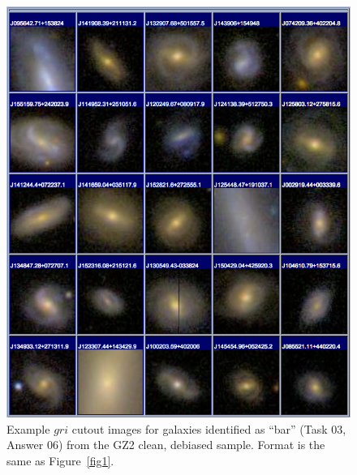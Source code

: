 \documentclass[useAMS,usenatbib]{mn2e}
\begin{document}
\newpage
\clearpage
\begin{figure}
\includegraphics[angle=0,width=7.0in]{figures/gallery/bar.png}
\caption{Example $gri$ cutout images for galaxies identified as ``bar'' (Task 03, Answer 06) from the GZ2 clean, debiased sample. Format is the same as Figure~\ref{fig1}.}
\end{figure}
\end{document}
